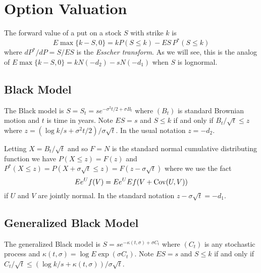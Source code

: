 \documentclass[11pt]{article}
\newcommand{\Cov}{\mathop{\rm{Cov}}}
\begin{document}
%

\section{Option Valuation}
The forward value of a put on a stock \(S\) with strike \(k\) is
\[
E\max\{k - S,0\} = k P(S \le k) - E S\,P^*(S \le k)
\]
where \(dP^*/dP = S/ES\) is the {\em Esscher transform}.
As we will see, this is the analog of 
\(E\max\{k - S,0\} = kN(-d_2) - sN(-d_1)\)
when \(S\) is lognormal.

\subsection{Black Model}
The Black model is \(S = S_t = se^{-\sigma^2t/2 + \sigma B_t}\)
where \((B_t)\) is standard Brownian motion and \(t\) is time
in years. Note \(ES = s\) and \(S \le k\)
if and only if \(B_t/\sqrt{t} \le z\) where
\(z = (\log k/s + \sigma^2 t/2)/\sigma\sqrt{t}\). In the usual
notation \(z = -d_2\).

Letting \(X = B_t/\sqrt{t}\) and so \(F = N\) is the standard
normal cumulative distributing function we have
\(P(X\le z) = F(z)\) and \(P^*(X\le z) = P(X + \sigma\sqrt{t} \le z)
= F(z - \sigma\sqrt{t})\) where we use the fact
\[
Ee^U f(V) = Ee^U Ef(V + \Cov(U,V))
\]
if \(U\) and \(V\) are
jointly normal. In the standard notation \(z - \sigma\sqrt{t} = -d_1\).

\subsection{Generalized Black Model}
The generalized Black model is \(S = se^{-\kappa(t,\sigma) + \sigma C_t}\)
where \((C_t)\) is any stochastic process and 
\(\kappa(t, \sigma) = \log E \exp(\sigma C_t)\). 
Note \(ES = s\) and \(S \le k\)
if and only if 
\(C_t/\sqrt{t} \le (\log k/s + \kappa(t,\sigma))/\sigma\sqrt{t}\).
\end{document}
